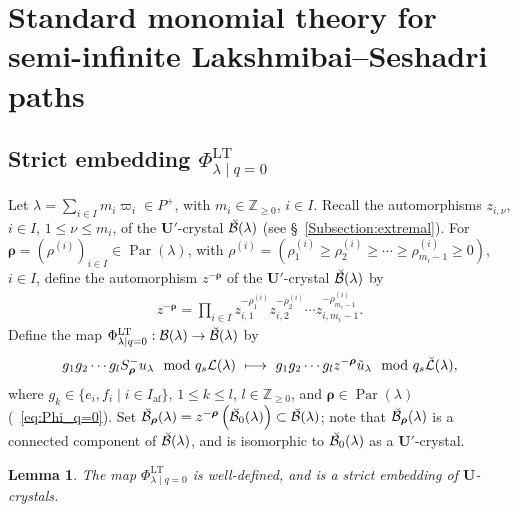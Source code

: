 \documentclass[10pt]{amsart}
\newtheorem{lemm}[theo]{Lemma}
\theoremstyle{definition}\newtheorem{defi}[theo]{Definition}
\theoremstyle{remark}\newtheorem{rema}[theo]{Remark}
\newcommand{\BZ}{\mathbb{Z}}
\newcommand\bmrho[1]{\boldsymbol{#1}}
\newcommand{\U}{\mathbf{U}}
\DeclareMathOperator{\af}{af}
\DeclareMathOperator{\LT}{LT}
\DeclareMathOperator{\Par}{Par}
\begin{document}
\section{Standard monomial theory for semi-infinite Lakshmibai--Seshadri paths} \label{Section:SMT}

\subsection{Strict embedding \texorpdfstring{$\Phi_{\lambda \mid q=0}^{\LT }$}{Phi lambda|q=0 LT}} \label{Subsection:LT}

Let 
$\lambda = \sum_{i \in I} m_i \varpi_i \in P^+$, 
with 
$m_i \in \BZ_{\geq 0}$, 
$i \in I$. 
Recall the automorphisms 
$z_{i,\nu}$, 
$i \in I$, $1 \leq \nu \leq m_i$, 
of the $\U'$-crystal
$\Breve{\mathcal{B}}(\lambda)$
(see \S~\ref{Subsection:extremal}). 
For 
$\bmrho{\rho} = (\rho^{(i)})_{i \in I} \in \Par (\lambda)$, 
with 
$\rho^{(i)} = (\rho^{(i)}_1 \geq \rho^{(i)}_2 \geq \cdots \geq \rho^{(i)}_{m_i -1} \geq 0)$, 
$i \in I$, 
define the automorphism 
$z^{-\bmrho{\rho}}$ 
of the $\U'$-crystal 
$\Breve{\mathcal{B}}(\lambda)$
by
\begin{align}
z^{-\bmrho{\rho}}
= 
\prod_{i \in I}
z_{i,1}^{- \rho^{(i)}_1} 
z_{i,2}^{- \rho^{(i)}_2}
\cdots 
z_{i,m_i-1}^{- \rho^{(i)}_{m_i-1}} .
\end{align}
Define the map
$\Phi_{\lambda \mid q=0}^{\LT } : 
\mathcal{B}(\lambda) \rightarrow 
\Breve{\mathcal{B}}(\lambda)$
by 
\begin{align} \label{eq:LT} 
g_1 g_2 \cdots g_l S_{\bmrho{\rho}}^- u_{\lambda} 
\mod q_s \mathcal{L}(\lambda) 
\ \longmapsto \ 
g_1 g_2 \cdots g_l z^{-\bmrho{\rho}} \Tilde{u}_{\lambda} 
\mod q_s \Breve{\mathcal{L}}(\lambda) ,
\end{align}
where 
$g_k \in \{ e_i , f_i \mid i \in I_{\af} \}$, 
$1 \leq k \leq l$, 
$l \in \BZ_{\geq 0}$, and 
$\bmrho{\rho} \in \Par (\lambda)$ 
(\cf~\eqref{eq:Phi_q=0}). 
Set 
$\Breve{\mathcal{B}}_{\bmrho{\rho}}(\lambda)
=
z^{-\bmrho{\rho}} \left( \Breve{\mathcal{B}}_0(\lambda) \right)
\subset \Breve{\mathcal{B}}(\lambda)$; 
note that
$\Breve{\mathcal{B}}_{\bmrho{\rho}}(\lambda)$
is a connected component of 
$\Breve{\mathcal{B}}(\lambda)$, 
and is isomorphic to
$\Breve{\mathcal{B}}_0(\lambda)$
as a $\U'$-crystal.

\begin{lemm} \label{lem:Phi_LT}
The map 
$\Phi_{\lambda \mid q=0}^{\LT }$ 
is well-defined, and is a strict embedding of $\U$-crystals.
\end{lemm}
\end{document}
